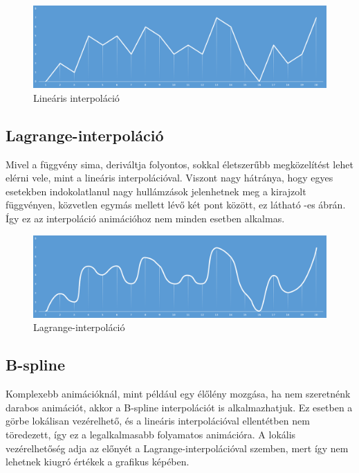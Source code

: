 \begin{figure}[h]
\centering
\includegraphics[scale=0.43]{kepek/linear_interpol.png}
\caption{Lineáris interpoláció}
\label{fig:linear}
\end{figure}

\subsection{Lagrange-interpoláció}

Mivel a függvény sima, deriváltja folyontos, sokkal életszerűbb megközelítést lehet elérni vele, mint a lineáris interpolációval. Viszont nagy hátránya, hogy egyes esetekben indokolatlanul nagy hullámzások jelenhetnek meg a kirajzolt függvényen, közvetlen egymás mellett lévő két pont között, ez látható -es ábrán. Így ez az interpoláció animációhoz nem minden esetben alkalmas.

\begin{figure}[h]
\centering
\includegraphics[scale=0.43]{kepek/non_linear_interpol.png}
\caption{Lagrange-interpoláció}
\label{fig:lagrange}
\end{figure}

\subsection{B-spline}

Komplexebb animációknál, mint például egy élőlény mozgása, ha nem szeretnénk darabos animációt, akkor a B-spline interpolációt is alkalmazhatjuk. Ez esetben a görbe lokálisan vezérelhető, és a lineáris interpolációval ellentétben nem töredezett, így ez a legalkalmasabb folyamatos animációra. A lokális vezérelhetőség adja az előnyét a Lagrange-interpolációval szemben, mert így nem lehetnek kiugró értékek a grafikus képében.

